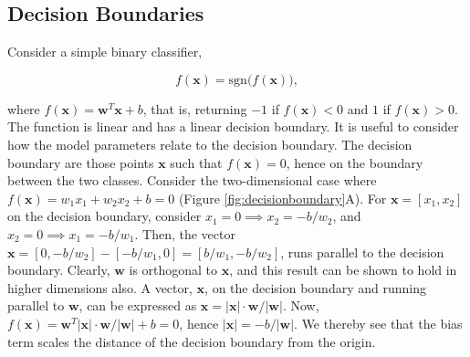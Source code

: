 \documentclass[11pt]{amsart}
\begin{document}
\subsection{Decision Boundaries}

Consider a simple binary classifier,

\begin{equation}
f(\mathbf{x}) = \text{sgn}\big(f(\mathbf{x})\big),
\label{eq:svmprimal}
\end{equation}

where $f(\mathbf{x}) = \mathbf{w}^T\mathbf{x} + b$, that is, returning $-1$ if $f(\mathbf{x}) < 0$ and $1$ if $f(\mathbf{x}) > 0$. The function is linear and has a linear decision boundary. It is useful to consider how the model parameters relate to the decision boundary. The decision boundary are those points $\mathbf{x}$ such that $f(\mathbf{x}) = 0$, hence on the boundary between the two classes. Consider the two-dimensional case where $f(\mathbf{x}) = w_1x_1 + w_2x_2 + b = 0$ (Figure \ref{fig:decisionboundary}A). For $\mathbf{x} = [x_1, x_2]$ on the decision boundary, consider $x_1 = 0 \implies x_2 = -b/w_2$, and $x_2 = 0 \implies x_1 = -b/w_1$. Then, the vector $\mathbf{x} = [0, -b/w_2] - [-b/w_1, 0] = [b/w_1, -b/w_2]$, runs parallel to the decision boundary. Clearly, $\mathbf{w}$ is orthogonal to $\mathbf{x}$, and this result can be shown to hold in higher dimensions also. A vector, $\mathbf{x}$, on the decision boundary and running parallel to $\mathbf{w}$, can be expressed as $\mathbf{x} = |\mathbf{x}|\cdot\mathbf{w}/|\mathbf{w}|$. Now, $f(\mathbf{x}) = \mathbf{w}^T|\mathbf{x}|\cdot\mathbf{w}/|\mathbf{w}| + b = 0$, hence $|\mathbf{x}| = -b/|\mathbf{w}|$. We thereby see that the bias term scales the distance of the decision boundary from the origin.
\end{document}
